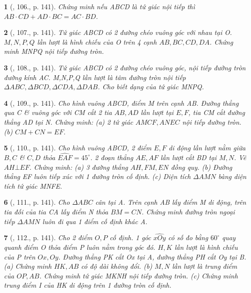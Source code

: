 \documentclass{article}
\newtheorem{baitoan}{}
\begin{document}
\begin{baitoan}[\cite{Tuyen_Toan_9_old}, 106., p. 141]
	Chứng minh nếu ABCD là tứ giác nội tiếp thì $AB\cdot CD + AD\cdot BC = AC\cdot BD$.
\end{baitoan}

\begin{baitoan}[\cite{Tuyen_Toan_9_old}, 107., p. 141]
	Tứ giác ABCD có 2 đường chéo vuông góc với nhau tại O. $M,N,P,Q$ lần lượt là hình chiếu của O trên 4 cạnh $AB,BC,CD,DA$. Chứng minh MNPQ nội tiếp đường tròn.
\end{baitoan}

\begin{baitoan}[\cite{Tuyen_Toan_9_old}, 108., p. 141]
	Tứ giác ABCD có 2 đường chéo vuông góc, nội tiếp đường tròn đường kính AC. M,N,P,Q lần lượt là tâm đường tròn nội tiếp $\Delta ABC,\Delta BCD,\Delta CDA,\Delta DAB$. Cho biết dạng của tứ giác MNPQ.
\end{baitoan}

\begin{baitoan}[\cite{Tuyen_Toan_9_old}, 109., p. 141]
	Cho hình vuông ABCD, điểm M trên cạnh AB. Đường thẳng qua C \& vuông góc với CM cắt 2 tia $AB,AD$ lần lượt tại $E,F$, tia CM cắt đường thẳng AD tại N. Chứng minh: (a) 2 tứ giác $AMCF,ANEC$ nội tiếp đường tròn. (b) $CM + CN = EF$.
\end{baitoan}

\begin{baitoan}[\cite{Tuyen_Toan_9_old}, 110., p. 141]
	Cho hình vuông ABCD, 2 điểm $E,F$ di động lần lượt nằm giữa $B,C$ \& $C,D$ thỏa $\widehat{EAF} = 45^\circ$. 2 đoạn thẳng $AE,AF$ lần lượt cắt BD tại $M,N$. Vẽ $AH\bot EF$. Chứng minh: (a) 3 đường thẳng $AH,FM,EN$ đồng quy. (b) Đường thẳng EF luôn tiếp xúc với 1 đường tròn cố định. (c) Diện tích $\Delta AMN$ bàng diện tích tứ giác MNFE.
\end{baitoan}

\begin{baitoan}[\cite{Tuyen_Toan_9_old}, 111., p. 141]
	Cho $\Delta ABC$ cân tại A. Trên cạnh AB lấy điểm M di động, trên tia đối của tia CA lấy điểm N thỏa $BM = CN$. Chứng minh đường tròn ngoại tiếp $\Delta AMN$ luôn đi qua 1 điểm cố định khác A.
\end{baitoan}

\begin{baitoan}[\cite{Tuyen_Toan_9_old}, 112., p. 141]
	Cho 2 điểm $O,P$ cố định. 1 góc $\widehat{xOy}$ có số đo bằng $60^\circ$ quay quanh điểm O thỏa điểm P luôn nằm trong góc đó. $H,K$ lần lượt là hình chiếu của P trên $Ox,Oy$. Đường thẳng PK cắt Ox tại A, đường thẳng PH cắt Oy tại B. (a) Chứng minh $HK,AB$ có độ dài không đổi. (b) $M,N$ lần lượt là trung điểm của $OP,AB$. Chứng minh tứ giác MKNH nội tiếp đường tròn. (c) Chứng minh trung điểm I của HK di động trên 1 đường tròn cố định.
\end{baitoan}
\end{document}
